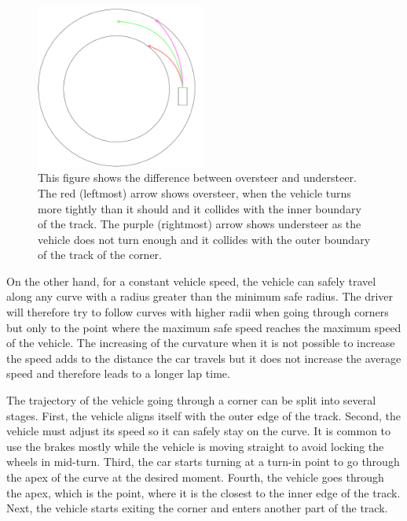 \begin{figure}[t]
	\centering
	\label{fig:oversteer_understeer}
	\includegraphics[trim=250 180 20 0, clip,width=0.5\textwidth]{../img/understeer_oversteer.pdf}
	\caption{This figure shows the difference between oversteer and understeer. The red (leftmost) arrow shows oversteer, when the vehicle turns more tightly than it should and it collides with the inner boundary of the track. The purple (rightmost) arrow shows understeer as the vehicle does not turn enough and it collides with the outer boundary of the track of the corner.}
\end{figure}

On the other hand, for a constant vehicle speed, the vehicle can safely travel along any curve with a radius greater than the minimum safe radius. The driver will therefore try to follow curves with higher radii when going through corners but only to the point where the maximum safe speed reaches the maximum speed of the vehicle. The increasing of the curvature when it is not possible to increase the speed adds to the distance the car travels but it does not increase the average speed and therefore leads to a longer lap time.

The trajectory of the vehicle going through a corner can be split into several stages. First, the vehicle aligns itself with the outer edge of the track. Second, the vehicle must adjust its speed so it can safely stay on the curve. It is common to use the brakes mostly while the vehicle is moving straight to avoid locking the wheels in mid-turn. Third, the car starts turning at a turn-in point to go through the apex of the curve at the desired moment. Fourth, the vehicle goes through the apex, which is the point, where it is the closest to the inner edge of the track. Next, the vehicle starts exiting the corner and enters another part of the track.

